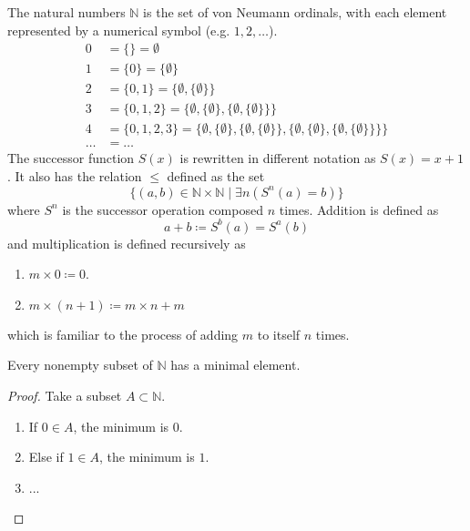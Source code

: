   \begin{definition}
    The natural numbers $\mathbb{N}$ is the set of von Neumann ordinals, with each element represented by a numerical symbol (e.g. $1, 2, \ldots$). 
    \begin{align*}
      0 & = \{\} = \emptyset \\
      1 & = \{0\} = \{\emptyset\} \\
      2 & = \{0,1\} = \{\emptyset,\{\emptyset\}\} \\
      3 & = \{0,1,2\} = \{\emptyset,\{\emptyset\},\{\emptyset,\{\emptyset\}\}\} \\
      4 & = \{0,1,2,3\} = \{\emptyset,\{\emptyset\},\{\emptyset,\{\emptyset\}\},\{\emptyset,\{\emptyset\},\{\emptyset,\{\emptyset\}\}\}\} \\
      \ldots & = \ldots 
    \end{align*} 
    The successor function $S(x)$ is rewritten in different notation as $S(x) = x + 1$. It also has the relation $\leq$ defined as the set
    \begin{equation}
      \{ (a, b) \in \mathbb{N} \times \mathbb{N} \mid \exists n (S^n(a) = b )\}
    \end{equation}
    where $S^n$ is the successor operation composed $n$ times. Addition is defined as 
    \begin{equation}
      a + b \coloneqq S^b (a) = S^a (b)
    \end{equation}
    and multiplication is defined recursively as 
    \begin{enumerate}
      \item $m \times 0 \coloneqq 0$. 
      \item $m \times (n + 1) \coloneqq m \times n + m$
    \end{enumerate}
    which is familiar to the process of adding $m$ to itself $n$ times. 
  \end{definition}

  \begin{lemma}
    Every nonempty subset of $\mathbb{N}$ has a minimal element. 
  \end{lemma} 
  \begin{proof}
    Take a subset $A \subset \mathbb{N}$. 
    \begin{enumerate}
      \item If $0 \in A$, the minimum is $0$. 
      \item Else if $1 \in A$, the minimum is $1$. 
      \item ...
    \end{enumerate} 
  \end{proof}

